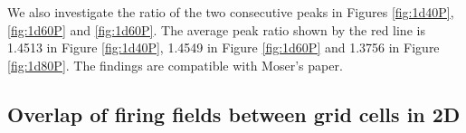 \documentclass[11pt, letterpaper, onecolumn]{article}
\begin{document}
We also investigate the ratio of the two consecutive peaks in Figures \ref{fig:1d40P}, \ref{fig:1d60P} and \ref{fig:1d60P}. The average peak ratio shown by the red line is 1.4513 in Figure \ref{fig:1d40P}, 1.4549 in Figure \ref{fig:1d60P} and 1.3756 in Figure \ref{fig:1d80P}. The findings are compatible with Moser's paper.






\subsection{Overlap of firing fields between grid cells in 2D}
\end{document}
